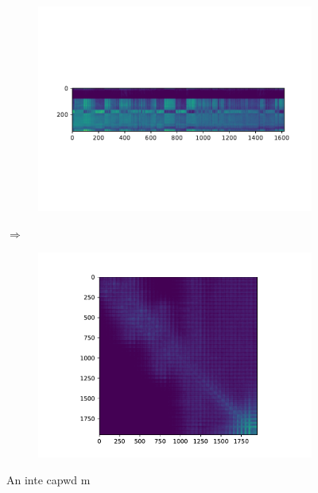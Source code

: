 \begin{figure}
\centering
\begin{subfigure}{0.3\linewidth}
\centering
\includegraphics[scale=0.6]{Pics/CISDENSE}
\caption{}
\end{subfigure}
$\Longrightarrow$
\begin{subfigure}{0.6\linewidth}
\centering
\includegraphics[scale=0.6]{Pics/CIS}
\caption{}
\end{subfigure}
\caption{An inte capwd m}
\end{figure}



